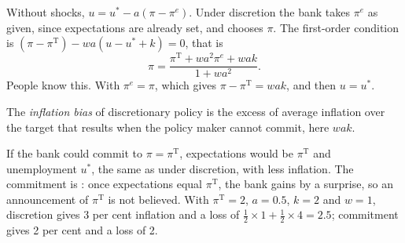 Without shocks, $u = u^* - a(\pi - \pi^e)$. Under discretion the bank takes $\pi^e$ as given, since expectations are already set, and chooses $\pi$. The first-order
condition is $(\pi - \pi^{\mathrm T}) - wa(u - u^* + k) = 0$, that is
\begin{equation}\label{eq:b2:expectations-and-lucas-critique:reaction}
\pi = \frac{\pi^{\mathrm T} + wa^2\pi^e + wak}{1 + wa^2}.
\end{equation}
People know this. With  $\pi^e = \pi$, which gives $\pi - \pi^{\mathrm T} = wak$, and then $u = u^*$.

\begin{definition}\label{def:b2:expectations-and-lucas-critique:inflation-bias}
The \emph{inflation bias} of discretionary policy is the excess of average inflation over the
target that results when the policy maker cannot commit, here $wak$.
\end{definition}

If the bank could commit to $\pi = \pi^{\mathrm T}$, expectations would be $\pi^{\mathrm T}$ and unemployment $u^*$, the same as under discretion, with less inflation. The commitment is :
once expectations equal $\pi^{\mathrm T}$, the bank gains by a surprise, so an announcement of $\pi^{\mathrm T}$ is not believed. With $\pi^{\mathrm T} = 2$, $a = 0.5$, $k = 2$ and $w = 1$, discretion gives 3 per
cent inflation and a loss of $\tfrac12 \times 1 + \tfrac12 \times 4 = 2.5$; commitment gives 2 per cent and a loss of 2.

